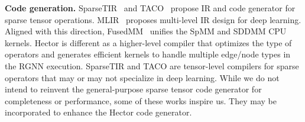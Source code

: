\noindent
\textbf{Code generation.} 
SparseTIR~\cite{yeSparseTIRComposableAbstractions2022} and TACO~\cite{kjolstadTensorAlgebraCompiler2017} propose IR and code generator for sparse tensor operations.
MLIR~\cite{lattnerMLIRScalingCompiler2021} proposes multi-level IR design for deep learning.
Aligned with this direction, FusedMM~\cite{rahmanFusedMMUnifiedSDDMMSpMM2021} unifies the SpMM and SDDMM CPU kernels. 
Hector is different as a higher-level compiler that optimizes the type of operators and generates efficient kernels to handle multiple edge/node types in the RGNN execution. SparseTIR and TACO are tensor-level compilers for sparse operators that may or may not specialize in deep learning.
While we do not intend to reinvent the general-purpose sparse tensor code generator for completeness or performance, some of these works inspire us. They may be incorporated to enhance the Hector code generator.
